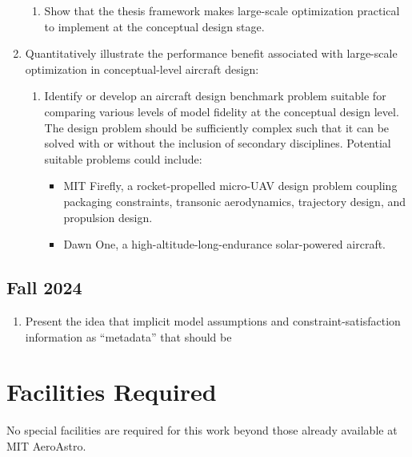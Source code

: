 \documentclass[12pt,vi,oneside]{report}
\begin{document}
\begin{enumerate}
\begin{enumerate}
            \item Show that the thesis framework makes large-scale optimization practical to implement at the conceptual design stage.
        \end{enumerate}
        \item Quantitatively illustrate the performance benefit associated with large-scale optimization in conceptual-level aircraft design:
        \begin{enumerate}
            \item Identify or develop an aircraft design benchmark problem suitable for comparing various levels of model fidelity at the conceptual design level. The design problem should be sufficiently complex such that it can be solved with or without the inclusion of secondary disciplines. Potential suitable problems could include:
            \begin{itemize}[nolistsep]
                \item MIT Firefly, a rocket-propelled micro-UAV design problem coupling packaging constraints, transonic aerodynamics, trajectory design, and propulsion design.
                \item Dawn One, a high-altitude-long-endurance solar-powered aircraft.
            \end{itemize}
        \end{enumerate}
    \end{enumerate}

    \subsection*{Fall 2024}

    \begin{enumerate}
        \item Present the idea that implicit model assumptions and constraint-satisfaction information as ``metadata'' that should be %
    \end{enumerate}


    \section{Facilities Required}
    \label{sec:facilities}

    No special facilities are required for this work beyond those already available at MIT AeroAstro.

    
\end{document}
